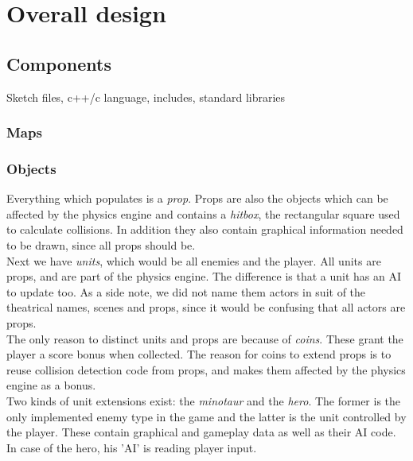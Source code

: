 \chapter{Overall design}

\section{Components}
Sketch files, c++/c language, includes, standard libraries

\subsection{Maps}


\subsection{Objects} %
Everything which populates is a \emph{prop}. Props are also the objects which can be affected by the physics engine and contains a \emph{hitbox}, the rectangular square used to calculate collisions. In addition they also contain graphical information needed to be drawn, since all props should be.\\
Next we have \emph{units}, which would be all enemies and the player. All units are props, and are part of the physics engine. The difference is that a unit has an AI to update too. As a side note, we did not name them actors in suit of the theatrical names, scenes and props, since it would be confusing that all actors are props.\\
The only reason to distinct units and props are because of \emph{coins}. These grant the player a score bonus when collected. The reason for coins to extend props is to reuse collision detection code from props, and makes them affected by the physics engine as a bonus.\\
Two kinds of unit extensions exist: the \emph{minotaur} and the \emph{hero}. The former is the only implemented enemy type in the game and the latter is the unit controlled by the player. These contain graphical and gameplay data as well as their AI code. In case of the hero, his 'AI' is reading player input.

